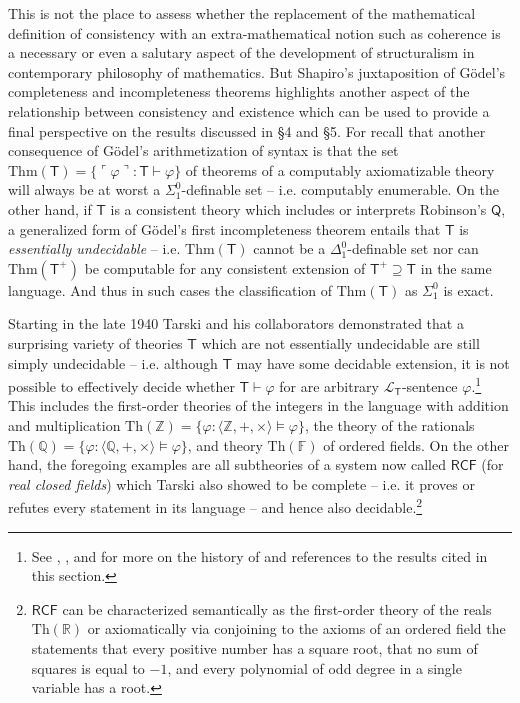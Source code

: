 \documentclass[11pt,fleqn,leqno]{article}
\def\phi{\varphi}
\def\proves{\vdash}
\begin{document}
This is not the place to assess whether the replacement of the mathematical definition of consistency with an extra-mathematical notion such as coherence is a necessary or even a salutary aspect of the development of structuralism in contemporary philosophy of mathematics.   But Shapiro's juxtaposition of G\"odel's completeness and incompleteness theorems highlights another aspect of the relationship between consistency and existence which can be used to provide a final perspective on the results discussed in \S 4 and \S 5.  For recall that another consequence of G\"odel's arithmetization of syntax is that the set $\mathrm{Thm}(\mathsf{T}) = \{\ulcorner \phi \urcorner : \mathsf{T} \proves \phi\}$ of theorems of a computably axiomatizable theory will always be at worst a $\Sigma^0_1$-definable set -- i.e. computably enumerable.  On the other hand, if $\mathsf{T}$ is a consistent theory which includes or interprets Robinson's $\mathsf{Q}$, a generalized form of  G\"odel's first incompleteness theorem entails that $\mathsf{T}$ is \textsl{essentially undecidable} -- i.e. $\mathrm{Thm}(\mathsf{T})$ cannot be a $\Delta^0_1$-definable set nor can $\mathrm{Thm}(\mathsf{T}^+)$ be computable for any consistent extension of $\mathsf{T}^+ \supseteq \mathsf{T}$ in the same language.   And thus in such cases the classification of $\mathrm{Thm}(\mathsf{T})$ as $\Sigma^0_1$ is exact.

Starting in the late 1940 Tarski and his collaborators demonstrated that a surprising variety of theories $\mathsf{T}$ which are not essentially undecidable are still simply undecidable -- i.e. although $\mathsf{T}$ may have some decidable extension, it is not possible to effectively decide whether $\mathsf{T} \proves \phi$ for are arbitrary $\mathcal{L}_{\mathsf{T}}$-sentence $\phi$.\footnote{See \citep{Tarski1953}, \citep{Greenberg2010}, and \citep{Makowsky2019} for more on the history of and references to the results cited in this section.}   This includes the first-order theories of the integers in the language with addition and multiplication $\mathrm{Th}(\mathbb{Z}) =\{\phi : \langle \mathbb{Z},+,\times\rangle \models \phi\}$, the theory of the rationals $\mathrm{Th}(\mathbb{Q}) =\{\phi : \langle \mathbb{Q},+,\times\rangle \models \phi\}$, and theory $\mathrm{Th}(\mathbb{F})$ of ordered fields.  On the other hand, the foregoing examples are all subtheories of a system now called $\mathsf{RCF}$ (for \textsl{real closed fields}) which Tarski also showed to be complete -- i.e. it proves or refutes every statement in its language -- and hence also decidable.\footnote{$\mathsf{RCF}$ can be characterized semantically as the first-order theory of the reals $\mathrm{Th}(\mathbb{R})$ or axiomatically via conjoining to the axioms of an ordered field the statements that every positive number has a square root, that no sum of squares is equal to $-1$, and every polynomial of odd degree in a single variable has a root.}
\end{document}
